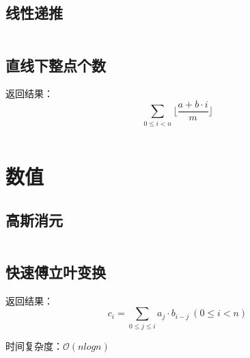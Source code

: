 \documentclass[landscape, oneside, a4paper, cs4size]{book}
\newcommand{\cppcode}[1]{
	\inputminted[mathescape,
	frame=lines,linenos]{cpp}{source/#1}
}
\begin{document}
\begin{multicols}{2}
\begin{spacing}{0.8}
\subsection{线性递推}

\cppcode{number-theory/linear-recurrence.cpp}











\subsection{直线下整点个数}


返回结果：$$\sum_{0 \leq i < n} \lfloor \frac{a + b \cdot i}{m} \rfloor$$
\cppcode{number-theory/lattice-count.cpp}


\section{数值}


\subsection{高斯消元}

\cppcode{numerical-algorithm/Gauss.cpp}


\subsection{快速傅立叶变换}


返回结果：$$c_i=\sum_{0 \leq j \leq i} a_j \cdot b_{i-j} \ (0 \leq i < n)$$

\indent 时间复杂度：$\mathcal{O}(n log n)$



\end{spacing}
\end{multicols}
\end{document}
